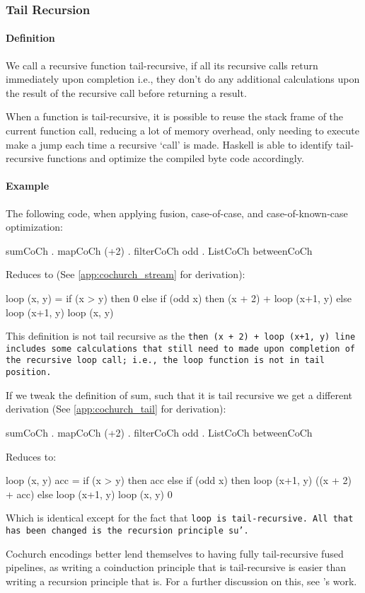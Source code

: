 
\subsubsection{Tail Recursion}\label{sec:tail}
\paragraph{Definition}
We call a recursive function tail-recursive, if all its recursive calls return immediately upon completion i.e., they don't do any additional calculations upon the result of the recursive call before returning a result.

When a function is tail-recursive, it is possible to reuse the stack frame of the current function call, reducing a lot of memory overhead, only needing to execute make a jump each time a recursive `call' is made.
Haskell is able to identify tail-recursive functions and optimize the compiled byte code accordingly.

\paragraph{Example}
The following code, when applying fusion, case-of-case, and case-of-known-case optimization:
\begin{spec}
sumCoCh . mapCoCh (+2) . filterCoCh odd . ListCoCh betweenCoCh
\end{spec}
Reduces to (See \autoref{app:cochurch_stream} for derivation):
\begin{spec}
loop (x, y) = if (x > y)
              then 0
              else if (odd x)
                   then (x + 2) + loop (x+1, y)
                   else loop (x+1, y)
loop (x, y)
\end{spec}
This definition is not tail recursive as the \tt{then (x + 2) + loop (x+1, y)} line includes some calculations that still need to made upon completion of the recursive \tt{loop} call; i.e., the \tt{loop} function is not in tail position.

If we tweak the definition of sum, such that it is tail recursive we get a different derivation (See \autoref{app:cochurch_tail} for derivation):
\begin{spec}
sumCoCh . mapCoCh (+2) . filterCoCh odd . ListCoCh betweenCoCh
\end{spec}
Reduces to:
\begin{spec}
loop (x, y) acc = if (x > y)
                  then acc
                  else if (odd x)
                       then loop (x+1, y) ((x + 2) + acc)
                       else loop (x+1, y)
loop (x, y) 0
\end{spec}
Which is identical except for the fact that \tt{loop} is tail-recursive.
All that has been changed is the recursion principle \tt{su'}.

Cochurch encodings better lend themselves to having fully tail-recursive fused pipelines, as writing a coinduction principle that is tail-recursive is easier than writing a recursion principle that is.
For a further discussion on this, see \cite{Breitner2018}'s work.
